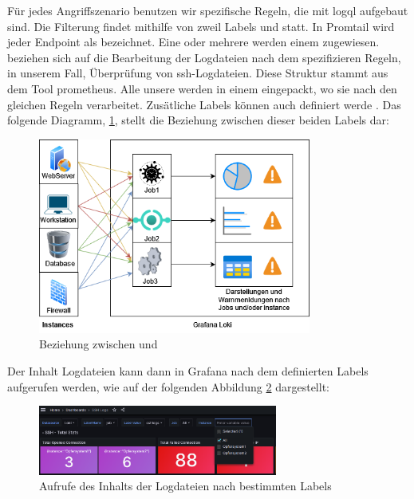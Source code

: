 
Für jedes Angriffszenario benutzen wir spezifische Regeln, die mit \gls{logql} aufgebaut sind. Die Filterung findet mithilfe von zweil Labels  und  statt. In Promtail wird jeder \gls{Endpoint} als  bezeichnet. Eine oder mehrere  werden einem  zugewiesen.  beziehen sich auf die Bearbeitung der Logdateien nach dem spezifizieren Regeln, in unserem Fall, Überprüfung von \gls{ssh}-Logdateien. Diese Struktur stammt aus dem Tool \gls{prometheus}. Alle unsere  werden in einem  eingepackt, wo sie nach den gleichen Regeln verarbeitet. Zusätliche Labels können auch definiert werde \citep{Prometheus_JobInstance}. Das folgende Diagramm, \ref{fig:Labels_GrafanaLoki}, stellt die Beziehung zwischen dieser beiden Labels dar:

\begin{figure}[H]
   \centering
   \includegraphics[width=0.8\textwidth]{assets/Instance_Jobs.drawio.png}
   \caption[Beziehung zwischen  und ]
   {Beziehung zwischen  und }
   \label{fig:Labels_GrafanaLoki}
   \centering
\end{figure}

\newpage
Der Inhalt Logdateien kann dann in Grafana nach dem definierten Labels aufgerufen werden, wie auf der folgenden Abbildung \ref{fig:screenshot_labels} dargestellt:

\begin{figure}[H]
   \centering
   \includegraphics[width=0.7\textwidth]{assets/Grafana_labels.png}
   \caption[Aufrufe des Inhalts der Logdateien nach bestimmten Labels]
   {Aufrufe des Inhalts der Logdateien nach bestimmten Labels}
   \label{fig:screenshot_labels}
   \centering
\end{figure}

